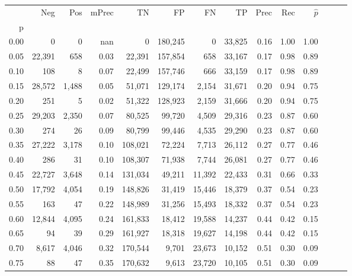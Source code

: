 \begin{tabular}{rrrrrrrrrrrrrr}
\toprule
{} &     Neg &    Pos & mPrec &       TN &       FP &      FN &      TP &  Prec &   Rec & $\hat{p}$ \\
p    &         &        &       &          &          &         &         &       &       &           \\
\midrule
0.00 &       0 &      0 &   nan &        0 &  180,245 &       0 &  33,825 &  0.16 &  1.00 &      1.00 \\
0.05 &  22,391 &    658 &  0.03 &   22,391 &  157,854 &     658 &  33,167 &  0.17 &  0.98 &      0.89 \\
0.10 &     108 &      8 &  0.07 &   22,499 &  157,746 &     666 &  33,159 &  0.17 &  0.98 &      0.89 \\
0.15 &  28,572 &  1,488 &  0.05 &   51,071 &  129,174 &   2,154 &  31,671 &  0.20 &  0.94 &      0.75 \\
0.20 &     251 &      5 &  0.02 &   51,322 &  128,923 &   2,159 &  31,666 &  0.20 &  0.94 &      0.75 \\
0.25 &  29,203 &  2,350 &  0.07 &   80,525 &   99,720 &   4,509 &  29,316 &  0.23 &  0.87 &      0.60 \\
0.30 &     274 &     26 &  0.09 &   80,799 &   99,446 &   4,535 &  29,290 &  0.23 &  0.87 &      0.60 \\
0.35 &  27,222 &  3,178 &  0.10 &  108,021 &   72,224 &   7,713 &  26,112 &  0.27 &  0.77 &      0.46 \\
0.40 &     286 &     31 &  0.10 &  108,307 &   71,938 &   7,744 &  26,081 &  0.27 &  0.77 &      0.46 \\
0.45 &  22,727 &  3,648 &  0.14 &  131,034 &   49,211 &  11,392 &  22,433 &  0.31 &  0.66 &      0.33 \\
0.50 &  17,792 &  4,054 &  0.19 &  148,826 &   31,419 &  15,446 &  18,379 &  0.37 &  0.54 &      0.23 \\
0.55 &     163 &     47 &  0.22 &  148,989 &   31,256 &  15,493 &  18,332 &  0.37 &  0.54 &      0.23 \\
0.60 &  12,844 &  4,095 &  0.24 &  161,833 &   18,412 &  19,588 &  14,237 &  0.44 &  0.42 &      0.15 \\
0.65 &      94 &     39 &  0.29 &  161,927 &   18,318 &  19,627 &  14,198 &  0.44 &  0.42 &      0.15 \\
0.70 &   8,617 &  4,046 &  0.32 &  170,544 &    9,701 &  23,673 &  10,152 &  0.51 &  0.30 &      0.09 \\
0.75 &      88 &     47 &  0.35 &  170,632 &    9,613 &  23,720 &  10,105 &  0.51 &  0.30 &      0.09 \\

\end{tabular}

